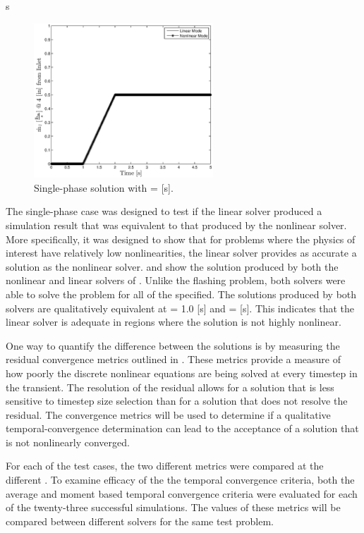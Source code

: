s\begin{figure}[h!tb]
\centering
\includegraphics[width=0.6\textwidth]{plots/single_1em5.eps}
\caption{Single-phase solution with \dtmax{} =  {[s]}.}
\label{fig:single_1em5}
\end{figure}

The single-phase case was designed to test if the linear solver produced a simulation result that was equivalent to that produced by the nonlinear solver.
More specifically, it was designed to show that for problems where the physics of interest have relatively low nonlinearities, the linear solver provides as accurate a solution as the nonlinear solver.
 and  show the solution produced by both the nonlinear and linear solvers of \cobra{}.
Unlike the flashing problem, both solvers were able to solve the problem for all of the \dtmax{} specified.
The solutions produced by both solvers are qualitatively equivalent at \dtmax{} = 1.0 [s] and \dtmax{} =  [s].
This indicates that the linear solver is adequate in regions where the solution is not highly nonlinear.

One way to quantify the difference between the solutions is by measuring the residual convergence metrics outlined in .
These metrics provide a measure of how poorly the discrete nonlinear equations are being solved at every timestep in the transient.
The resolution of the residual allows for a solution that is less sensitive to timestep size selection than for a solution that does not resolve the residual.
The convergence metrics will be used to determine if a qualitative temporal-convergence determination can lead to the acceptance of a solution that is not nonlinearly converged.

For each of the test cases, the two different metrics were compared at the different \dtmax{}.
To examine efficacy of the the temporal convergence criteria, both the average and moment based temporal convergence criteria were evaluated for each of the twenty-three successful simulations.
The values of these metrics will be compared between different solvers for the same test problem. 

